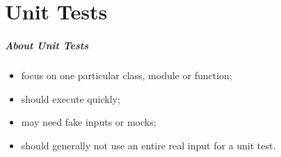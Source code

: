 \documentclass{beamer}
\newenvironment{changemargin}[1]{%
  \begin{list}{}{%
    \setlength{\topsep}{0pt}%
    \setlength{\leftmargin}{#1}%
    \setlength{\rightmargin}{1em}
    \setlength{\listparindent}{\parindent}%
    \setlength{\itemindent}{\parindent}%
    \setlength{\parsep}{\parskip}%
  }%
  \item[]}{\end{list}}
\begin{document}
\part{Unit Tests}
\begin{frame}
  \partpage
\end{frame}


\begin{frame}
  \frametitle{About Unit Tests}
  \begin{changemargin}{2em}
    \Large
    \begin{itemize}
    \item focus on one particular class, module or function;
    \item should execute quickly;
    \item may need fake inputs or mocks;
    \item should generally not use an entire real input for a unit test.
    \end{itemize}
  \end{changemargin}
\end{frame}
\end{document}
